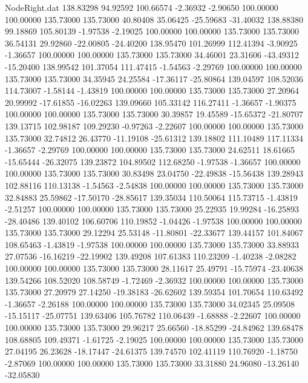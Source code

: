 \begin{filecontents}{NodeRight.dat}
 138.83298   94.92592  100.66574    -2.36932   -2.90650  100.00000  100.00000  135.73000  135.73000   40.80408   35.06425  -25.59683  -31.40032
 138.88380   99.18869  105.80139    -1.97538   -2.19025  100.00000  100.00000  135.73000  135.73000   36.54131   29.92860  -22.00805  -24.40200
 138.95470  101.26999  112.41394    -3.90925   -1.36657  100.00000  100.00000  135.73000  135.73000   34.46001   23.31606  -43.49312  -15.20400
 138.99542  101.37054  111.47415    -1.54563   -2.29769  100.00000  100.00000  135.73000  135.73000   34.35945   24.25584  -17.36117  -25.80864
 139.04597  108.52036  114.73007    -1.58144   -1.43819  100.00000  100.00000  135.73000  135.73000   27.20964   20.99992  -17.61855  -16.02263
 139.09660  105.33142  116.27411    -1.36657   -1.90375  100.00000  100.00000  135.73000  135.73000   30.39857   19.45589  -15.65372  -21.80707
 139.13715  102.98187  109.29230    -0.97263   -2.22607  100.00000  100.00000  135.73000  135.73000   32.74812   26.43770  -11.19108  -25.61312
 139.18802  111.10489  117.11334    -1.36657   -2.29769  100.00000  100.00000  135.73000  135.73000   24.62511   18.61665  -15.65444  -26.32075
 139.23872  104.89502  112.68250    -1.97538   -1.36657  100.00000  100.00000  135.73000  135.73000   30.83498   23.04750  -22.49838  -15.56438
 139.28943  102.88116  110.13138    -1.54563   -2.54838  100.00000  100.00000  135.73000  135.73000   32.84883   25.59862  -17.50170  -28.85617
 139.35034  110.50064  115.73715    -1.43819   -2.51257  100.00000  100.00000  135.73000  135.73000   25.22935   19.99284  -16.25893  -28.40486
 139.40102  106.60706  110.19852    -1.04426   -1.97538  100.00000  100.00000  135.73000  135.73000   29.12294   25.53148  -11.80801  -22.33677
 139.44157  101.84067  108.65463    -1.43819   -1.97538  100.00000  100.00000  135.73000  135.73000   33.88933   27.07536  -16.16219  -22.19902
 139.49208  107.61383  110.23209    -1.40238   -2.08282  100.00000  100.00000  135.73000  135.73000   28.11617   25.49791  -15.75974  -23.40638
 139.54266  108.52020  108.58749    -1.72469   -2.36932  100.00000  100.00000  135.73000  135.73000   27.20979   27.14250  -19.38183  -26.62602
 139.59354  101.70654  110.63492    -1.36657   -2.26188  100.00000  100.00000  135.73000  135.73000   34.02345   25.09508  -15.15117  -25.07751
 139.63406  105.76782  110.06439    -1.68888   -2.22607  100.00000  100.00000  135.73000  135.73000   29.96217   25.66560  -18.85299  -24.84962
 139.68478  108.68805  109.49371    -1.61725   -2.19025  100.00000  100.00000  135.73000  135.73000   27.04195   26.23628  -18.17447  -24.61375
 139.74570  102.41119  110.76920    -1.18750   -2.87069  100.00000  100.00000  135.73000  135.73000   33.31880   24.96080  -13.26140  -32.05830

\end{filecontents}

